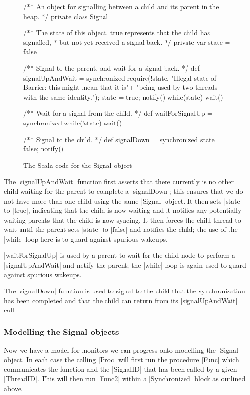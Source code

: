\begin{figure}[H]
  \begin{scala}
  /** An object for signalling between a child and its parent in the heap. */
  private class Signal{
    /** The state of this object.  true represents that the child has signalled,
      * but not yet received a signal back. */
    private var state = false

    /** Signal to the parent, and wait for a signal back. */
    def signalUpAndWait = synchronized{
      require(!state, 
        "Illegal state of Barrier: this might mean that it is\n"+
        "being used by two threads with the same identity.");
      state = true; notify()
      while(state) wait()
    }

    /** Wait for a signal from the child. */
    def waitForSignalUp = synchronized{ while(!state) wait() }

    /** Signal to the child. */
    def signalDown = synchronized{ state = false; notify() }
  }
  \end{scala}
  \caption{The Scala code for the {\scalastyle Signal} object}
  \label{fig:Signal}
\end{figure}

The |signalUpAndWait| function first asserts that there currently is no other child waiting for the parent to complete a |signalDown|; this ensures that we do not have more than one child using the same |Signal| object. It then sets |state| to |true|, indicating that the child is now waiting and it notifies any potentially waiting parents that the child is now syncing. It then forces the child thread to wait until the parent sets |state| to |false| and notifies the child; the use of the |while| loop here is to guard against spurious wakeups.

|waitForSignalUp| is used by a parent to wait for the child node to perform a |signalUpAndWait| and notify the parent; the |while| loop is again used to guard against spurious wakeups.

The |signalDown| function is used to signal to the child that the synchronisation has been completed and that the child can return from its |signalUpAndWait| call.

\subsubsection{Modelling the Signal objects}

Now we have a model for monitors we can progress onto modelling the |Signal| object. In each case the calling |Proc| will first run the procedure |Func| which communicates the function and the |SignalID| that has been called by a given |ThreadID|. This will then run |Func2| within a |Synchronized| block as outlined above. \newpage

